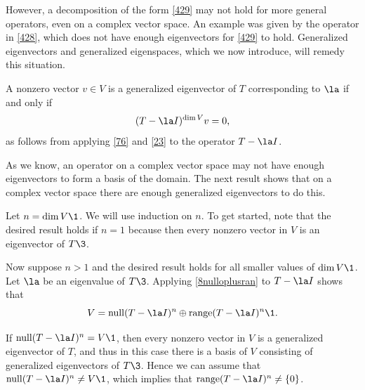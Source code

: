 However, a decomposition of the form \ref{429} may not
hold for more general operators, even on a complex vector space. An
example was given by the operator in \ref{428}, which does not have
enough eigenvectors for \ref{429} to hold. Generalized eigenvectors and generalized eigenspaces,
which we now introduce, will remedy this situation.



A nonzero vector $v \in V$ is a generalized eigenvector of $T$ corresponding to $\la$ if and only if
\[
(T - \la I)^{\dim V} v = 0,
\]
as follows from applying \ref{76} and \ref{23} to the operator $T  - \la I$.

As we know, an operator on a complex vector space may not have enough
eigenvectors to form a basis of the domain.  The next result shows that on a
complex vector space there are enough generalized eigenvectors to do this.


\proof
Let $n = \dim V\1$. We will use induction on $n$. To get started, note that the desired result holds if $n=1$ because then every nonzero vector in $V$ is an eigenvector of $T\3$.


Now suppose $n > 1$ and the desired result holds for all smaller values of $\dim V\1$. Let $\la$ be an eigenvalue of $T\3$. Applying \ref{8nulloplusran} to $T - \la I$ shows that
\[
V = \ker(T - \la I)^n \oplus \ran (T - \la I)^n\1.
\]

If $\ker(T - \la I)^n = V\1$, then every nonzero vector in $V$ is a generalized eigenvector of $T$, and thus in this case there is a basis of $V$ consisting of generalized eigenvectors of $T\3$. Hence we can assume that $\ker(T - \la I)^n \ne V\1$, which implies that
$\ran (T - \la I)^n \ne \br{0}$.


